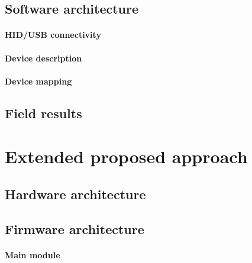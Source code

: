 \documentclass[a4paper,10pt]{article}
\begin{document}
\begin{multicols}{2}
\subsection{Software architecture}

\TODO


\paragraph{HID/USB connectivity}
\TODO


\paragraph{Device description}
\TODO


\paragraph{Device mapping}
\TODO


\subsection{Field results}

\TODO


\section{Extended proposed approach}

\TODO


\subsection{Hardware architecture}

\TODO


\subsection{Firmware architecture}

\TODO


\paragraph{Main module}
\TODO



\end{multicols}
\end{document}

